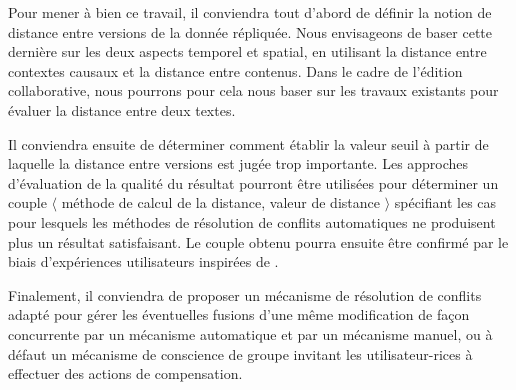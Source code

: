Pour mener à bien ce travail, il conviendra tout d'abord de définir la notion de distance entre versions de la donnée répliquée.
Nous envisageons de baser cette dernière sur les deux aspects temporel et spatial, \ie en utilisant la distance entre contextes causaux et la distance entre contenus.
Dans le cadre de l'édition collaborative, nous pourrons pour cela nous baser sur les travaux existants pour évaluer la distance entre deux textes.

Il conviendra ensuite de déterminer comment établir la valeur seuil à partir de laquelle la distance entre versions est jugée trop importante.
Les approches d'évaluation de la qualité du résultat \cite{2016-quality-assessment-wikipedia-articles-dang} pourront être utilisées pour déterminer un couple $\langle$ méthode de calcul de la distance, valeur de distance $\rangle$ spécifiant les cas pour lesquels les méthodes de résolution de conflits automatiques ne produisent plus un résultat satisfaisant.
Le couple obtenu pourra ensuite être confirmé par le biais d'expériences utilisateurs inspirées de \cite{2014-effect-delay-collaborative-editing-ignat,2015-cope-delay-collaborative-note-taking-ignat}.

Finalement, il conviendra de proposer un mécanisme de résolution de conflits adapté pour gérer les éventuelles fusions d'une même modification de façon concurrente par un mécanisme automatique et par un mécanisme manuel, ou à défaut un mécanisme de conscience de groupe invitant les utilisateur-rices à effectuer des actions de compensation.
